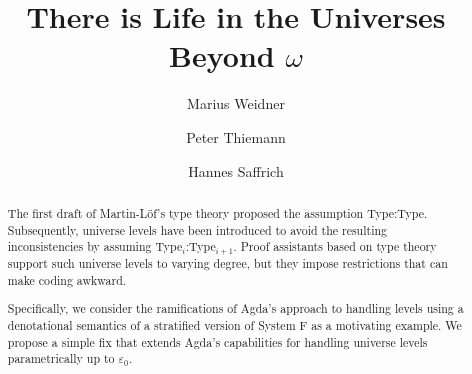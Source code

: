 \documentclass[manuscript,screen,review,anonymous]{acmart}
\begin{document}
\title{There is Life in the Universes Beyond $\omega$}

\author{Marius Weidner}

\author{Peter Thiemann}

\author{Hannes Saffrich}


\begin{abstract}
  The first draft of Martin-L\"{o}f's type theory proposed the
  assumption Type:Type. Subsequently, universe levels have been introduced to
  avoid the resulting inconsistencies by assuming
  Type$_i$:Type$_{i+1}$. 
  Proof assistants based on type theory support such universe levels
  to varying degree, but they impose restrictions that can make coding
  awkward.

  Specifically, we consider the ramifications of Agda's
  approach to handling levels using a denotational semantics of a
  stratified version of System F as a motivating example.
  We propose a simple fix that extends Agda's capabilities for handling
  universe levels parametrically up to $\varepsilon_0$.
\end{abstract}



\end{document}
